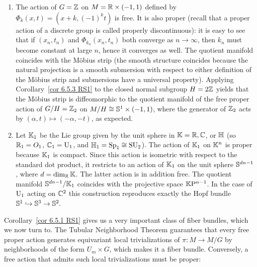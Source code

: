 \begin{example}[{{\cite[Example~6.5.4]{RS1}}}]
    \begin{enumerate}
        \item The action of $G=\mathbb{Z}$ on $M=\mathbb{R}\times (-1,1)$ defined by $\Phi_k(x,t)=(x+k,(-1)^kt)$ is free. It is also proper (recall that a proper action of a discrete group is called properly discontinuous): it is easy to see that if $(x_n,t_n)$ and $\Phi_{k_n}(x_n,t_n)$ both converge as $n\to \infty$, then $k_n$ must become constant at large $n$, hence it converges as well. The quotient manifold coincides with the M\"obius strip (the smooth structure coincides because the natural projection is a smooth submersion with respect to either definition of the M\"obius strip and submersions have a universal property). Applying Corollary~\ref{cor 6.5.3 RS1} to the closed normal subgroup $H=2\mathbb{Z}$ yields that the M\"obius strip is diffeomorphic to the quotient manifold of the free proper action of $G\slash H=\mathbb{Z}_2$ on $M\slash H\cong \mathbb{S}^1\times (-1,1)$, where the generator of $\mathbb{Z}_2$ acts by $(\alpha,t)\mapsto (-\alpha,-t)$, as expected.
        \item Let $\mathbb{K}_1$ be the Lie group given by the unit sphere in $\mathbb{K}=\mathbb{R},\mathbb{C}$, or $\mathbb{H}$ (so $\mathbb{R}_1=O_1$, $\mathbb{C}_1=\operatorname{U}_1$, and $\mathbb{H}_1=\operatorname{Sp}_1\cong \operatorname{SU}_2$). The action of $\mathbb{K}_1$ on $\mathbb{K}^n$ is proper because $\mathbb{K}_1$ is compact. Since this action is isometric with respect to the standard dot product, it restricts to an action of $\mathbb{K}_1$ on the unit sphere $\mathbb{S}^{dn-1}$, where $d=\dim_{\mathbb{R}}\mathbb{K}$. The latter action is in addition free. The quotient manifold $\mathbb{S}^{dn-1}\slash\mathbb{K}_1$ coincides with the projective space $\mathbb{K}\mathrm{P}^{n-1}$. In the case of $\operatorname{U}_1$ acting on $\mathbb{C}^2$ this construction reproduces exactly the Hopf bundle $\mathbb{S}^1\hookrightarrow \mathbb{S}^3\to \mathbb{S}^2.$
    \end{enumerate}
\end{example}


Corollary~\ref{cor 6.5.1 RS1} gives us a very important class of fiber bundles, which we now turn to. The Tubular Neighborhood Theorem guarantees that every free proper action generates equivariant local trivializations of $\pi:M\to M\slash G$ by neighborhoods of the form $U_m\times G$, which makes it a fiber bundle. Conversely, a free action that admits such local trivializations must be proper:

